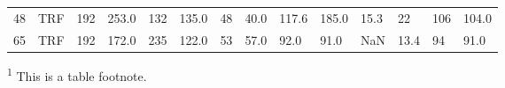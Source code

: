\begin{longtable}{|l|l|l|l|l|l|l|l|l|l|l|l|l|l|}
  48 &   TRF &                         192 &                    253.0 &                     132 &                135.0 &            48 &       40.0 &         117.6 &      185.0 &              15.3 &                  22 &               106 &          104.0 \\
  65 &   TRF &                         192 &                    172.0 &                     235 &                122.0 &            53 &       57.0 &          92.0 &       91.0 &               NaN & 13.4 &                94 &           91.0\footnotemark \\

\end{longtable}
\footnotesize{\textsuperscript{1} This is a table footnote.}
\finishlandscape
